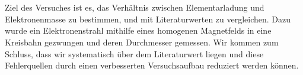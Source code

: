 \section*{\abstractname}
Ziel des Versuches ist es, das Verhältnis zwischen Elementarladung und Elektronenmasse zu bestimmen, und mit Literaturwerten zu vergleichen. Dazu wurde ein Elektronenstrahl mithilfe eines homogenen Magnetfelds in eine Kreisbahn gezwungen und deren Durchmesser gemessen. Wir kommen zum Schluss, dass wir systematisch über dem Literaturwert liegen und diese Fehlerquellen durch einen verbesserten Versuchsaufbau reduziert werden können.

\vspace{3cm}